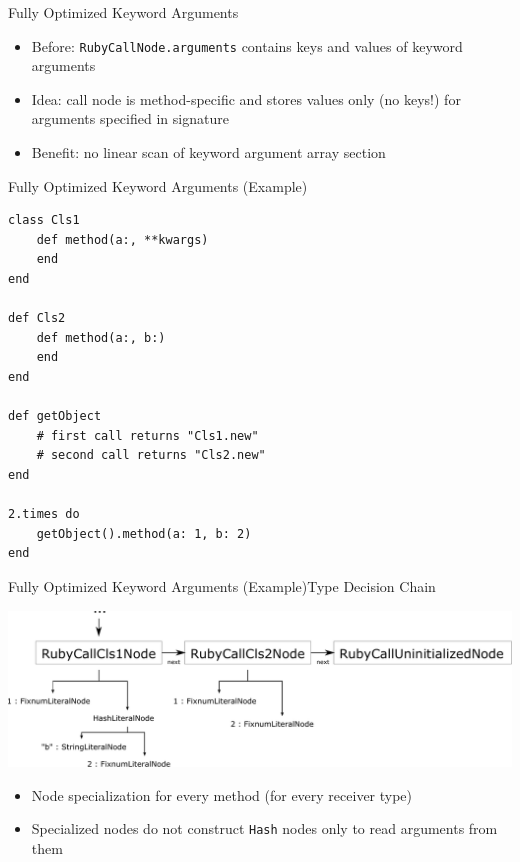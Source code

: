 \documentclass[xcolor=dvipsname,handout]{beamer} %
\begin{document}
\begin{frame}{Fully Optimized Keyword Arguments}
\begin{itemize}
    \item Before: \lstinline{RubyCallNode.arguments} contains keys and values of keyword arguments
    \item Idea: call node is method-specific and stores values only (no keys!) for arguments specified in signature
    \item Benefit: no linear scan of keyword argument array section
\end{itemize}
\end{frame}

\begin{frame}[fragile]{Fully Optimized Keyword Arguments (Example)}
\begin{lstlisting}
class Cls1
    def method(a:, **kwargs)
    end
end

def Cls2
    def method(a:, b:)
    end
end

def getObject
    # first call returns "Cls1.new"
    # second call returns "Cls2.new"
end

2.times do
    getObject().method(a: 1, b: 2)
end
\end{lstlisting}
\end{frame}

\begin{frame}{Fully Optimized Keyword Arguments (Example)}{Type Decision Chain}
\begin{table}
    \centering
    \includegraphics[width=\textwidth]{fully_opt.pdf}
\end{table}

\begin{itemize}
    \item Node specialization for every method (for every receiver type)
    \item Specialized nodes do not construct \lstinline{Hash} nodes only to read arguments from them
\end{itemize}
\end{frame}
\end{document}
